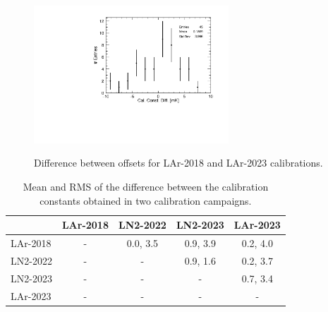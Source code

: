 \begin{figure}[htbp]
\centering
{\includegraphics[width=0.65\textwidth]{images/LAr2018-LAr2023_REF.pdf}}
\caption{Difference between offsets for LAr-2018 and LAr-2023 calibrations.}
\label{fig:LAr2018AllDiff}
\end{figure}

\begin{table}[htbp]
\begin{center}
\begin{tabular}{l c c c c}
         & LAr-2018 & LN2-2022 & LN2-2023 & LAr-2023  \\ \hline
LAr-2018 &    -     & 0.0, 3.5& 0.9, 3.9 & 0.2, 4.0 \\
LN2-2022 &    -     &    -     & 0.9, 1.6 &  0.2, 3.7 \\
LN2-2023 &    -     &    -     &    -     & 0.7, 3.4 \\
LAr-2023 &    -     &    -     &    -     &     -     \\
\end{tabular}
\end{center}
\caption{Mean and RMS of the difference between the calibration constants obtained in two calibration campaigns.}
\label{tab:calib_comparison}
\end{table}

